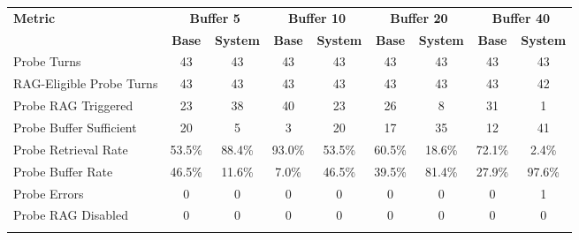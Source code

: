 \begin{landscape}
\begin{longtable}{@{}p{3.8cm}cccccccc@{}}
\toprule
\textbf{Metric} & \multicolumn{2}{c}{\textbf{Buffer 5}} & \multicolumn{2}{c}{\textbf{Buffer 10}} & \multicolumn{2}{c}{\textbf{Buffer 20}} & \multicolumn{2}{c}{\textbf{Buffer 40}} \\
\cmidrule(lr){2-3}\cmidrule(lr){4-5}\cmidrule(lr){6-7}\cmidrule(lr){8-9}
 & \textbf{Base} & \textbf{System} & \textbf{Base} & \textbf{System} & \textbf{Base} & \textbf{System} & \textbf{Base} & \textbf{System} \\
\midrule
\endhead
Probe Turns & 43 & 43 & 43 & 43 & 43 & 43 & 43 & 43 \\
RAG-Eligible Probe Turns & 43 & 43 & 43 & 43 & 43 & 43 & 43 & 42 \\
Probe RAG Triggered & 23 & 38 & 40 & 23 & 26 & 8 & 31 & 1 \\
Probe Buffer Sufficient & 20 & 5 & 3 & 20 & 17 & 35 & 12 & 41 \\
Probe Retrieval Rate & 53.5\% & 88.4\% & 93.0\% & 53.5\% & 60.5\% & 18.6\% & 72.1\% & 2.4\% \\
Probe Buffer Rate & 46.5\% & 11.6\% & 7.0\% & 46.5\% & 39.5\% & 81.4\% & 27.9\% & 97.6\% \\
Probe Errors & 0 & 0 & 0 & 0 & 0 & 0 & 0 & 1 \\
Probe RAG Disabled & 0 & 0 & 0 & 0 & 0 & 0 & 0 & 0 \\
\botrule
\end{longtable}
\normalsize
\end{landscape}
